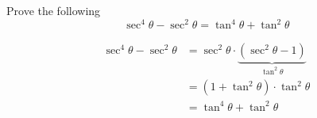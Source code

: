 

\question[1] Prove the following 
  \[\sec^4\theta - \sec^2\theta = \tan^4\theta + \tan^2\theta\]


\ifprintanswers
\fi

\begin{solution}[\mcq]
   \begin{align}
      \sec^4\theta - \sec^2\theta &= \sec^2\theta\cdot\underbrace{(\sec^2\theta - 1)}_{\tan^2\theta} \\
      &= (1+\tan^2\theta)\cdot\tan^2\theta \\
      &= \tan^4\theta + \tan^2\theta
   \end{align}
\end{solution}
